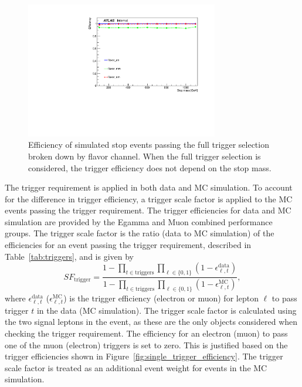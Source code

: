 \begin{figure}[ht]
  \centering
  \includegraphics[width=0.75\textwidth]
    {figs/trigger/EF_e24vhi_medium1_OR_EF_e60_medium1_OR_EF_mu24i_tight_OR_EF_mu36_tight.pdf}
  \caption{Efficiency of simulated stop events passing the full trigger
    selection broken down by flavor channel.
    When the full trigger selection is considered, the trigger efficiency does
    not depend on the stop mass.
  }
  \label{fig:full_trigger_efficiency}
\end{figure}

The trigger requirement is applied in both data and MC simulation.
To account for the difference in trigger efficiency, a trigger scale factor is
applied to the MC events passing the trigger requirement.
The trigger efficiencies for data and MC simulation are provided by
the Egamma and Muon combined performance groups.
The trigger scale factor is the ratio (data to MC simulation) of the
efficiencies for an event passing the trigger requirement, described in
Table~\ref{tab:triggers}, and is given by
\begin{equation}
  SF_\mathrm{trigger} =
  \frac{1- \prod_{t \in \mathrm{triggers}}\prod_{\ell \in \{0,1\}}
                 (1-\epsilon_{\ell, t}^\mathrm{data})}
       {1- \prod_{t \in \mathrm{triggers}}\prod_{\ell \in \{0,1\}}
                 (1-\epsilon_{\ell, t}^\mathrm{MC})},
\end{equation}
where $\epsilon_{\ell,t}^\mathrm{data}$ ($\epsilon_{\ell,t}^\mathrm{MC}$) is
the trigger efficiency (electron or muon) for lepton $\ell$ to pass trigger $t$
in the data (MC simulation).
The trigger scale factor is calculated using the two signal leptons in the
event, as these are the only objects considered when checking the trigger
requirement.
The efficiency for an electron (muon) to pass one of the muon (electron)
triggers is set to zero.
This is justified based on the trigger efficiencies shown in
Figure~\ref{fig:single_trigger_efficiency}.
The trigger scale factor is treated as an additional event weight for events in
the MC simulation.

